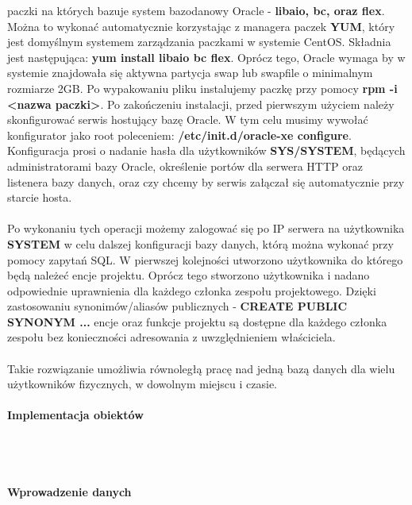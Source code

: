 \documentclass[polish, 11pt]{article}
\begin{document}
			    paczki na których bazuje system bazodanowy Oracle - {\bfseries libaio, bc, oraz flex}. Można to wykonać automatycznie
			    korzystając z managera paczek {\bfseries YUM}, który jest domyślnym systemem zarządzania paczkami w systemie CentOS.
			    Składnia jest następująca: {\bfseries yum install libaio bc flex}. Oprócz tego, Oracle wymaga by w systemie znajdowała się
			    aktywna partycja swap lub swapfile o minimalnym rozmiarze 2GB. Po wypakowaniu pliku instalujemy paczkę przy pomocy
			    {\bfseries rpm -i <nazwa paczki>}. Po zakończeniu instalacji, przed pierwszym użyciem należy skonfigurować serwis hostujący
			    bazę Oracle. W tym celu musimy wywołać konfigurator jako root poleceniem: {\bfseries /etc/init.d/oracle-xe configure}. Konfiguracja
			    prosi o nadanie hasła dla użytkowników {\bfseries SYS/SYSTEM}, będących administratorami bazy Oracle, określenie portów dla serwera
			    HTTP oraz listenera bazy danych, oraz czy chcemy by serwis załączał się automatycznie przy starcie hosta.\\\\
			    Po wykonaniu tych operacji możemy zalogować się po IP serwera na użytkownika {\bfseries SYSTEM} w celu dalszej konfiguracji bazy danych,
			    którą można wykonać przy pomocy zapytań SQL. W pierwszej kolejności utworzono użytkownika do którego będą należeć encje projektu.
			    Oprócz tego stworzono użytkownika i nadano odpowiednie uprawnienia dla każdego członka zespołu projektowego. Dzięki zastosowaniu
			    synonimów/aliasów publicznych - {\bfseries CREATE PUBLIC SYNONYM ...} encje oraz funkcje projektu są dostępne dla każdego członka
			    zespołu bez konieczności adresowania z uwzględnieniem właściciela.\\\\ 
			    Takie rozwiązanie umożliwia równoległą pracę nad jedną bazą danych dla wielu użytkowników fizycznych, w dowolnym miejscu i czasie.
		    
		    \paragraph{Implementacja obiektów}\mbox{}\\\\
		    
		    \paragraph{Wprowadzenie danych}\mbox{}\\\\
		    
\end{document}
